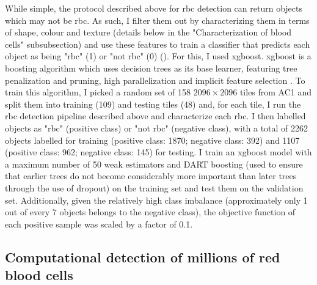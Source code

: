 While simple, the protocol described above for \ac{rbc} detection can return objects which may not be \ac{rbc}. As such, I filter them out by characterizing them in terms of shape, colour and texture (details below in the "Characterization of blood cells" subsubsection) and use these features to train a classifier that predicts each object as being "\ac{rbc}" (1) or "not \ac{rbc}" (0) (). For this, I used \ac{xgboost}. \ac{xgboost} is a boosting algorithm which uses decision trees as its base learner, featuring tree penalization and pruning, high parallelization and implicit feature selection \cite{Chen2016-xk}. To train this algorithm, I picked a random set of 158 $2096 \times 2096$ tiles from AC1 and split them into training (109) and testing tiles (48) and, for each tile, I run the \ac{rbc} detection pipeline described above and characterize each \ac{rbc}. I then labelled objects as "\ac{rbc}" (positive class) or "not \ac{rbc}" (negative class), with a total of 2262 objects labelled for training (positive class: 1870; negative class: 392) and 1107 (positive class: 962; negative class: 145) for testing. I train an \ac{xgboost} model with a maximum number of 50 weak estimators and DART boosting (used to ensure that earlier trees do not become considerably more important than later trees through the use of dropout) \cite{Rashmi2015-qe} on the training set and test them on the validation set. Additionally, given the relatively high class imbalance (approximately only 1 out of every 7 objects belongs to the negative class), the objective function of each positive sample was scaled by a factor of 0.1.

\begin{figure}[!ht]
    \label{fig:rbc-filter-examples}
\end{figure}

\subsection{Computational detection of millions of red blood cells}

